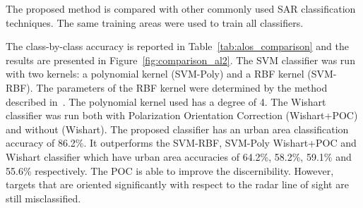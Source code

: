The proposed method is compared with other commonly used SAR classification techniques. The same training areas were used to train all classifiers.


The class-by-class accuracy is reported in Table~\ref{tab:alos_comparison} and the results are presented in Figure~\ref{fig:comparison_al2}. The SVM classifier was run with two kernels: a polynomial kernel (SVM-Poly) and a RBF kernel (SVM-RBF). The parameters of the RBF kernel were determined by the method described in~\cite{liu2011gaussian}. The polynomial kernel used has a degree of 4. The Wishart classifier was run both with Polarization Orientation Correction  (Wishart+POC) and without (Wishart). The proposed classifier has an urban area classification accuracy of 86.2\%. It outperforms the SVM-RBF, SVM-Poly Wishart+POC and Wishart classifier which have urban area accuracies of 64.2\%, 58.2\%, 59.1\% and 55.6\% respectively. The POC is able to improve the discernibility. However, targets that are oriented significantly with respect to the radar line of sight are still misclassified. 


